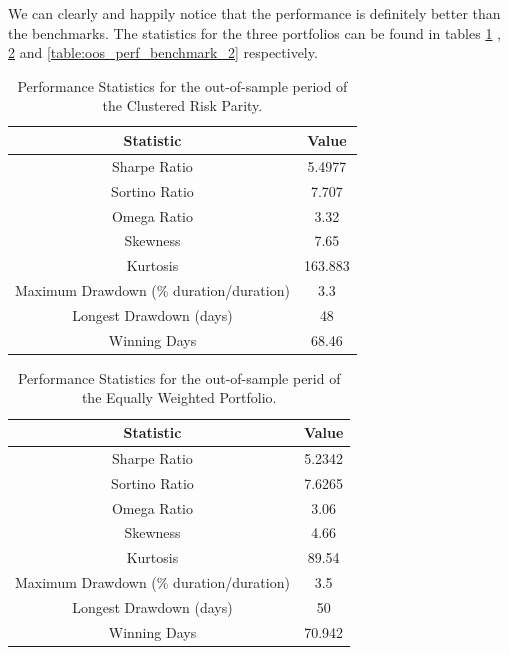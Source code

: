 We can clearly and happily notice that the performance is definitely better than the benchmarks. The statistics for the three portfolios can be found in tables \ref{table:oos_perf_CRP} , \ref{table:oos_perf_benchmark_1}  and \ref{table:oos_perf_benchmark_2}  respectively.


\begin{table}
	\centering
	\begin{tabular}{c|c}
		\textbf{Statistic} & \textbf{Value} \\\hline
		Sharpe Ratio & 5.4977 \\ 
		Sortino Ratio & 7.707 \\ 
		Omega Ratio & 3.32 \\ 
		Skewness & 7.65 \\ 
		Kurtosis & 163.883 \\ 
		Maximum Drawdown (\% duration/duration) & 3.3 \\ 
		Longest Drawdown (days) & 48 \\ 
		Winning Days & 68.46 \\ 
	\end{tabular}
	\caption{\label{table:oos_perf_CRP} Performance Statistics for the out-of-sample period of the Clustered Risk Parity.}
\end{table}

\begin{table}
	\centering
	\begin{tabular}{c|c}
		\textbf{Statistic} & \textbf{Value} \\\hline
		Sharpe Ratio & 5.2342 \\ 
		Sortino Ratio & 7.6265 \\ 
		Omega Ratio & 3.06 \\ 
		Skewness & 4.66 \\ 
		Kurtosis & 89.54 \\ 
		Maximum Drawdown (\% duration/duration) & 3.5 \\ 
		Longest Drawdown (days) & 50 \\ 
		Winning Days & 70.942 \\ 
	\end{tabular}
	\caption{\label{table:oos_perf_benchmark_1} Performance Statistics for the out-of-sample perid of the Equally Weighted Portfolio.}
\end{table}


